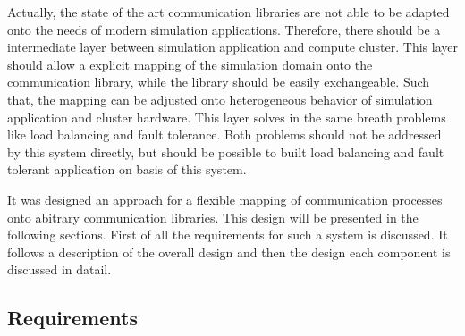   Actually, the state of the art communication libraries are not able to
  be adapted onto the needs of modern simulation applications.
  Therefore, there should be a intermediate layer between simulation
  application and compute cluster. This layer should allow a explicit
  mapping of the simulation domain onto the communication library,
  while the library should be easily exchangeable. Such that, the
  mapping can be adjusted onto heterogeneous behavior of simulation
  application and cluster hardware. This layer solves in the same
  breath problems like load balancing and fault tolerance. Both
  problems should not be addressed by this system directly, but
  should be possible to built load balancing and fault tolerant
  application on basis of this system.

  It was designed an approach for a flexible mapping of communication
  processes onto abitrary communication libraries. This design will
  be presented in the following sections. First of all the
  requirements for such a system is discussed. It follows a
  description of the overall design and then the design each component
  is discussed in datail.


\subsection{Requirements}
\label{sec:requirements}




